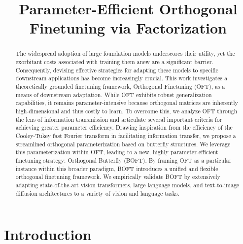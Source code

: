 \title{Parameter-Efficient Orthogonal Finetuning via Factorization}

\begin{abstract}
The widespread adoption of large foundation models underscores their utility, yet the exorbitant costs associated with training them anew are a significant barrier. Consequently, devising effective strategies for adapting these models to specific downstream applications has become increasingly crucial. This work investigates a theoretically grounded finetuning framework, Orthogonal Finetuning (OFT), as a means of downstream adaptation. While OFT exhibits robust generalization capabilities, it remains parameter-intensive because orthogonal matrices are inherently high-dimensional and thus costly to learn. To overcome this, we analyze OFT through the lens of information transmission and articulate several important criteria for achieving greater parameter efficiency. Drawing inspiration from the efficiency of the Cooley-Tukey fast Fourier transform in facilitating information transfer, we propose a streamlined orthogonal parameterization based on butterfly structures. We leverage this parameterization within OFT, leading to a new, highly parameter-efficient finetuning strategy: Orthogonal Butterfly (BOFT). By framing OFT as a particular instance within this broader paradigm, BOFT introduces a unified and flexible orthogonal finetuning framework. We empirically validate BOFT by extensively adapting state-of-the-art vision transformers, large language models, and text-to-image diffusion architectures to a variety of vision and language tasks.
\end{abstract}

\section{Introduction}

